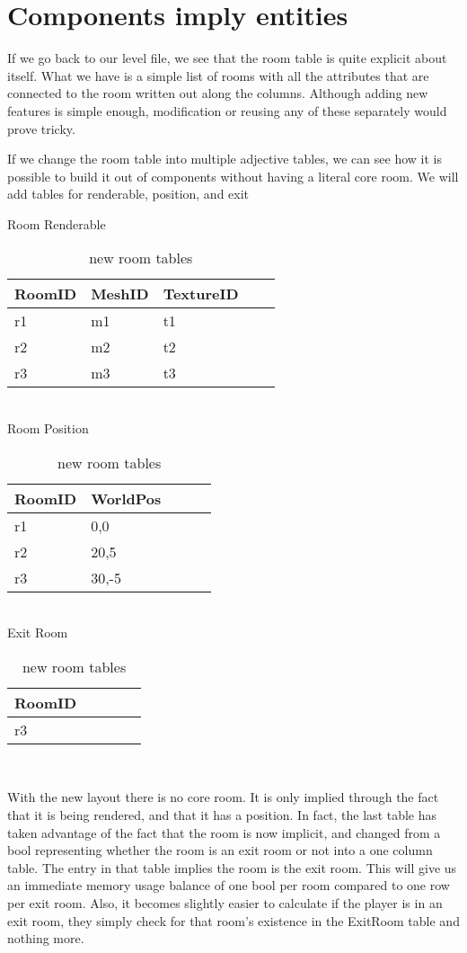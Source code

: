 \section{Components imply entities}

If we go back to our level file, we see that the room table is quite explicit
about itself. What we have is a simple list of rooms with all the attributes
that are connected to the room written out along the columns. Although adding
new features is simple enough, modification or reusing any of these separately
would prove tricky.

If we change the room table into multiple adjective tables, we can see how it
is possible to build it out of components without having a literal core room.
We will add tables for renderable, position, and exit

\begin{table}[h]\footnotesize
Room Renderable \\
\begin{tabular}{lllll}
\bf{RoomID}&MeshID&TextureID \\
\hline
r1&m1&t1 \\
r2&m2&t2 \\
r3&m3&t3 \\
\end{tabular}\\
Room Position \\
\begin{tabular}{lllll}
\bf{RoomID}&WorldPos \\
\hline
r1&0,0 \\
r2&20,5 \\
r3&30,-5 \\
\end{tabular}\\
Exit Room \\
\begin{tabular}{lllll}
\bf{RoomID} \\
\hline
r3 \\
\end{tabular}\\
\caption{new room tables}
\end{table}

With the new layout there is no core room. It is only implied through the fact
that it is being rendered, and that it has a position. In fact, the last table
has taken advantage of the fact that the room is now implicit, and changed from
a bool representing whether the room is an exit room or not into a one column
table. The entry in that table implies the room is the exit room. This will
give us an immediate memory usage balance of one bool per room compared to one
row per exit room.  Also, it becomes slightly easier to calculate if the player
is in an exit room, they simply check for that room's existence in the ExitRoom
table and nothing more.

